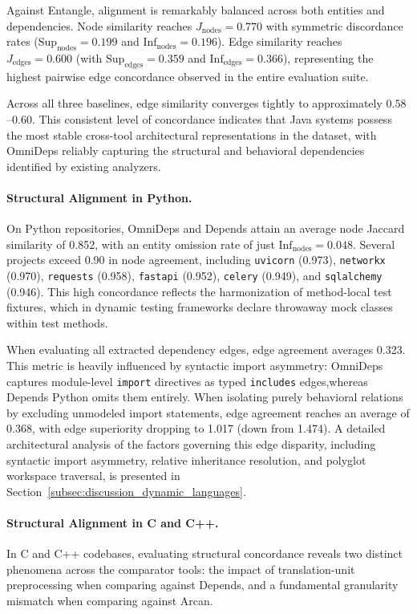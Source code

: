Against Entangle, alignment is remarkably balanced across both
entities and dependencies. Node similarity reaches $J_{\text{nodes}}
= 0.770$ with symmetric discordance rates ($\text{Sup}_{\text{nodes}}
= 0.199$ and $\text{Inf}_{\text{nodes}} = 0.196$). Edge similarity
reaches $J_{\text{edges}} = 0.600$ (with $\text{Sup}_{\text{edges}} =
0.359$ and $\text{Inf}_{\text{edges}} = 0.366$), representing the
highest pairwise edge concordance observed in the entire evaluation suite.

Across all three baselines, edge similarity converges tightly to
approximately $0.58$--$0.60$. This consistent level of concordance
indicates that Java systems possess the most stable cross-tool
architectural representations in the dataset, with OmniDeps reliably
capturing the structural and behavioral dependencies identified by
existing analyzers.

\paragraph{Structural Alignment in Python.}
On Python repositories, OmniDeps and Depends attain an average node
Jaccard similarity of 0.852, with an entity omission rate of just
$\text{Inf}_{\text{nodes}} = 0.048$. Several projects exceed 0.90 in
node agreement, including \texttt{uvicorn} (0.973), \texttt{networkx}
(0.970), \texttt{requests} (0.958), \texttt{fastapi} (0.952),
\texttt{celery} (0.949), and \texttt{sqlalchemy} (0.946). This high
concordance reflects the harmonization of method-local test fixtures,
which in dynamic testing frameworks declare throwaway mock classes
within test methods.

When evaluating all extracted dependency edges, edge agreement
averages 0.323. This metric is heavily influenced by syntactic import
asymmetry: OmniDeps captures module-level \texttt{import} directives
as typed \texttt{includes} edges,\linebreak whereas Depends Python omits them
entirely. When isolating purely behavioral relations by excluding
unmodeled import statements, edge agreement reaches an average of
0.368, with edge superiority dropping to 1.017 (down from 1.474). A
detailed architectural analysis of the factors governing this edge
disparity, including syntactic import asymmetry, relative inheritance
resolution, and polyglot workspace traversal, is presented in
Section~\ref{subsec:discussion_dynamic_languages}.

\paragraph{Structural Alignment in C and C++.}
In C and C++ codebases, evaluating structural
concordance reveals two distinct phenomena across the comparator
tools: the impact of translation-unit preprocessing when comparing
against Depends, and a fundamental granularity mismatch when
comparing against Arcan.

